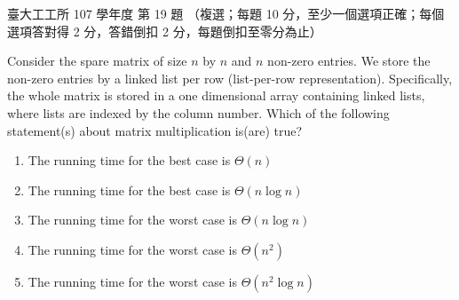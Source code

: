 \begin{pastexam}[label={px:ntu-107-ie-ds-19}]{臺大工工所 107 學年度 第 19 題}
（複選；每題 10 分，至少一個選項正確；每個選項答對得 2 分，答錯倒扣 2 分，每題倒扣至零分為止）

Consider the spare matrix of size $n$ by $n$ and $n$ non-zero entries. We store the non-zero entries by a linked list per row (list-per-row representation). Specifically, the whole matrix is stored in a one dimensional array containing linked lists, where lists are indexed by the column number. Which of the following statement(s) about matrix multiplication is(are) true?
\begin{enumerate}[label=(\alph*),nosep]
\item The running time for the best case is $\Theta(n)$
\item The running time for the best case is $\Theta(n\log n)$
\item The running time for the worst case is $\Theta(n\log n)$
\item The running time for the worst case is $\Theta(n^2)$
\item The running time for the worst case is $\Theta(n^2\log n)$
\end{enumerate}
\end{pastexam}


